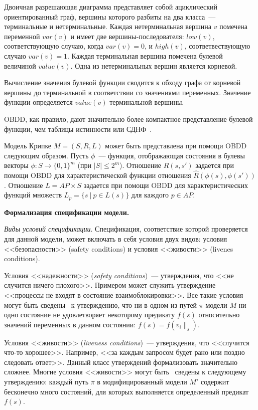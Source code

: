 \documentclass[a4paper,notitlepage,14pt]{article}
\begin{document}
Двоичная разрешающая диаграмма представляет собой ациклический ориентированный граф,
вершины которого разбиты на два класса~--- терминальные и нетерминальные. Каждая
нетерминальная вершина $v$ помечена переменной $var(v)$ и имеет две вершины-последователя:
$low(v)$, соответствующую случаю, когда $var(v) = 0$, и $high(v)$, соответвествующую
случаю $var(v) = 1$. Каждая терминальная вершина помечена булевой величиной
$value(v)$. Одна из нетерминальных вершин является корневой.

Вычисление значения булевой функции сводится к обходу графа от корневой вершины до
терминальной в соответствии со значениями переменных. Значение функции определяется
$value(v)$ терминальной вершины. 

OBDD, как правило, дают значительно более компактное представление булевой функции, чем
таблицы истинности или СДНФ~\cite{Clarke}.

Модель Крипке $M = (S, R, L)$ может быть представлена при помощи OBDD следующим
образом. Пусть $\phi$~--- функция, отображающая состояния в булевы векторы $\phi: S
\rightarrow \{0, 1\}^m$ (при $|S| \leq 2^m$). Отношение $R(s, s')$ задается при помощи
OBDD для характеристической функции отношения $\widehat{R}(\phi(s), \phi(s'))$. Отношение
$L = AP \times S$ задается при помощи OBDD для характеристических функций множеств $L_p =
\{s~|~p \in L(s) \}$ для каждого $p \in AP$.

\textbf{Формализация спецификации модели.}

\textit{Виды условий спецификации}. Спецификация, соответствие которой проверяется для
данной модели, может включать в себя условия двух видов: условия <<безопасности>> (safety
conditions) и условия <<живости>> (livenes conditions).

Условия <<надежности>> (\emph{safety conditions})~--- утверждения, что <<не случится
ничего плохого>>. Примером может служить утверждение <<процессы не входят в состояние
взаимоблокировки>>. Все такие условия могут быть сведены~\cite{Clarke} к утверждению, что
ни в одном из путей $\pi$ модели $M$ ни одно состояние не удовлетворяет некоторому
предикату $f(s)$ относительно значений переменных в данном состоянии: $f(s) = f(v_i\|_s)$.

Условия <<живости>> (\emph{liveness conditions})~--- утверждения, что <<случится что-то
хорошее>>. Например, <<за каждым запросом будет рано или поздно следовать ответ>>. Данный
класс утверждений формализовать значительно сложнее. Многие условия <<живости>> могут
быть~\cite{Clarke97anotherlook} сведены к следующему утверждению: каждый путь $\pi$ в
модифицированный модели $M'$ содержит бесконечно много состояний, для которых выполняется
определенный предикат $f(s)$.
\end{document}
